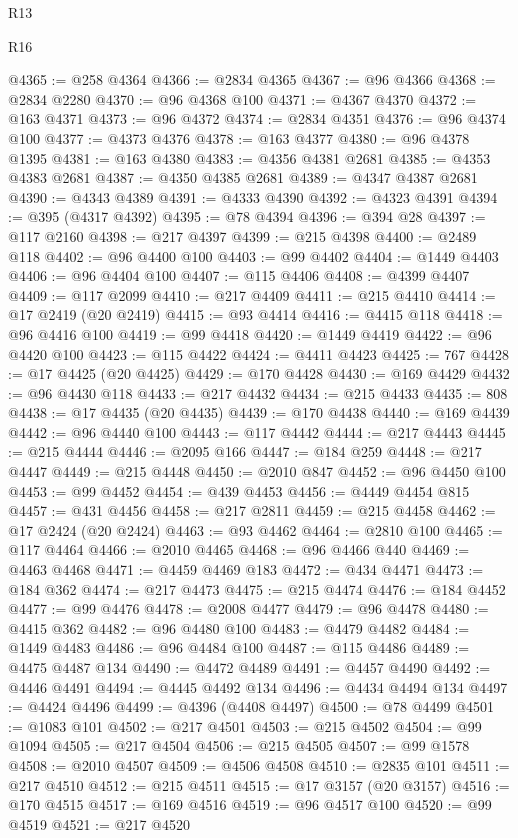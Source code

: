 \begin{lexlean}{R13}
\begin{lexlean}{R16}
\begin{coremodule}
{{{{{{{{{{{{{{{{{{{{{{{{{{{{{{{{{{{{{{{{{{{{{{{{{{{{{{{{{{{{{{{{{{{{{{{{{{{{{{{{{{{{{{{{{{{{{{{{{{{{{{{{{{{{{{{{{@4365 := @258 @4364
@4366 := @2834 @4365
@4367 := @96 @4366
@4368 := @2834 @2280
@4370 := @96 @4368 @100
@4371 := @4367 @4370
@4372 := @163 @4371
@4373 := @96 @4372
@4374 := @2834 @4351
@4376 := @96 @4374 @100
@4377 := @4373 @4376
@4378 := @163 @4377
@4380 := @96 @4378 @1395
@4381 := @163 @4380
@4383 := @4356 @4381 @2681
@4385 := @4353 @4383 @2681
@4387 := @4350 @4385 @2681
@4389 := @4347 @4387 @2681
@4390 := @4343 @4389
@4391 := @4333 @4390
@4392 := @4323 @4391
@4394 := @395 (@4317 @4392)
@4395 := @78 @4394
@4396 := @394 @28
@4397 := @117 @2160
@4398 := @217 @4397
@4399 := @215 @4398
@4400 := @2489 @118
@4402 := @96 @4400 @100
@4403 := @99 @4402
@4404 := @1449 @4403
@4406 := @96 @4404 @100
@4407 := @115 @4406
@4408 := @4399 @4407
@4409 := @117 @2099
@4410 := @217 @4409
@4411 := @215 @4410
@4414 := @17 @2419 (@20 @2419)
@4415 := @93 @4414
@4416 := @4415 @118
@4418 := @96 @4416 @100
@4419 := @99 @4418
@4420 := @1449 @4419
@4422 := @96 @4420 @100
@4423 := @115 @4422
@4424 := @4411 @4423
@4425 := 767
@4428 := @17 @4425 (@20 @4425)
@4429 := @170 @4428
@4430 := @169 @4429
@4432 := @96 @4430 @118
@4433 := @217 @4432
@4434 := @215 @4433
@4435 := 808
@4438 := @17 @4435 (@20 @4435)
@4439 := @170 @4438
@4440 := @169 @4439
@4442 := @96 @4440 @100
@4443 := @117 @4442
@4444 := @217 @4443
@4445 := @215 @4444
@4446 := @2095 @166
@4447 := @184 @259
@4448 := @217 @4447
@4449 := @215 @4448
@4450 := @2010 @847
@4452 := @96 @4450 @100
@4453 := @99 @4452
@4454 := @439 @4453
@4456 := @4449 @4454 @815
@4457 := @431 @4456
@4458 := @217 @2811
@4459 := @215 @4458
@4462 := @17 @2424 (@20 @2424)
@4463 := @93 @4462
@4464 := @2810 @100
@4465 := @117 @4464
@4466 := @2010 @4465
@4468 := @96 @4466 @440
@4469 := @4463 @4468
@4471 := @4459 @4469 @183
@4472 := @434 @4471
@4473 := @184 @362
@4474 := @217 @4473
@4475 := @215 @4474
@4476 := @184 @4452
@4477 := @99 @4476
@4478 := @2008 @4477
@4479 := @96 @4478
@4480 := @4415 @362
@4482 := @96 @4480 @100
@4483 := @4479 @4482
@4484 := @1449 @4483
@4486 := @96 @4484 @100
@4487 := @115 @4486
@4489 := @4475 @4487 @134
@4490 := @4472 @4489
@4491 := @4457 @4490
@4492 := @4446 @4491
@4494 := @4445 @4492 @134
@4496 := @4434 @4494 @134
@4497 := @4424 @4496
@4499 := @4396 (@4408 @4497)
@4500 := @78 @4499
@4501 := @1083 @101
@4502 := @217 @4501
@4503 := @215 @4502
@4504 := @99 @1094
@4505 := @217 @4504
@4506 := @215 @4505
@4507 := @99 @1578
@4508 := @2010 @4507
@4509 := @4506 @4508
@4510 := @2835 @101
@4511 := @217 @4510
@4512 := @215 @4511
@4515 := @17 @3157 (@20 @3157)
@4516 := @170 @4515
@4517 := @169 @4516
@4519 := @96 @4517 @100
@4520 := @99 @4519
@4521 := @217 @4520
}}}}}}}}}}}}}}}}}}}}}}}}}}}}}}}}}}}}}}}}}}}}}}}}}}}}}}}}}}}}}}}}}}}}}}}}}}}}}}}}}}}}}}}}}}}}}}}}}}}}}}}}}}}}}}}}}
\end{coremodule}
\end{lexlean}
\end{lexlean}
